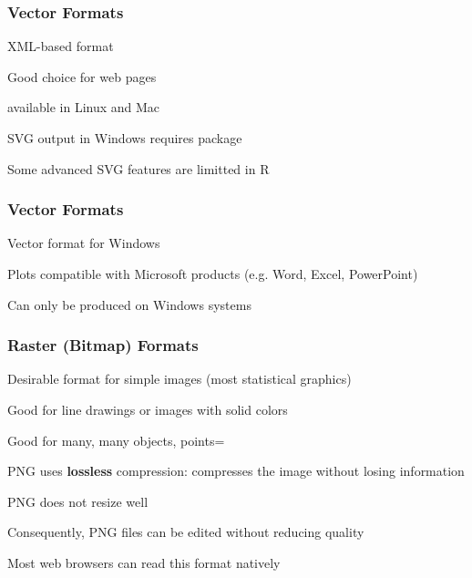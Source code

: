 \documentclass[12pt]{beamer}\usepackage[]{graphicx}\usepackage[]{color}
\begin{document}

\begin{frame}
\frametitle{Vector Formats}

\bi
  \item XML-based format
  \item Good choice for web pages
  \item {} available in Linux and Mac
  \item SVG output in Windows requires package 
  \item Some advanced SVG features are limitted in R
\ei
\eb

\end{frame}


\begin{frame}
\frametitle{Vector Formats}

\bi
  \item Vector format for Windows
  \item Plots compatible with Microsoft products (e.g. Word, Excel, PowerPoint)
  \item Can only be produced on Windows systems
\ei
\eb

\end{frame}


\begin{frame}
\frametitle{Raster (Bitmap) Formats}

\bi
  \item Desirable format for simple images (most statistical graphics)
  \item Good for line drawings or images with solid colors
  \item Good for many, many objects, points=
  \item PNG uses \textbf{lossless} compression: compresses the image without losing information
  \item PNG does not resize well
  \item Consequently, PNG files can be edited without reducing quality
  \item Most web browsers can read this format natively
\ei
\eb

\end{frame}

\end{document}
